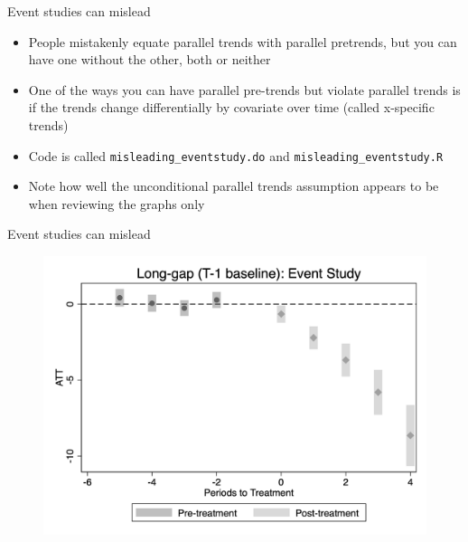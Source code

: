 \documentclass{beamer}
\begin{document}
\begin{frame}{Event studies can mislead}

\begin{itemize}

\item People mistakenly equate parallel trends with parallel pretrends, but you can have one without the other, both or neither
\item One of the ways you can have parallel pre-trends but violate parallel trends is if the trends change differentially by covariate over time (called x-specific trends)
\item Code is called \texttt{misleading_eventstudy.do} and \texttt{misleading_eventstudy.R}
\item Note how well the unconditional parallel trends assumption appears to be when reviewing the graphs only
\end{itemize}

\end{frame}

\begin{frame}{Event studies can mislead}

\begin{figure}
    \centering
    \includegraphics[height=0.75\textheight]{./lecture_includes/es_flawed.png}
\end{figure}

\end{frame}
\end{document}
